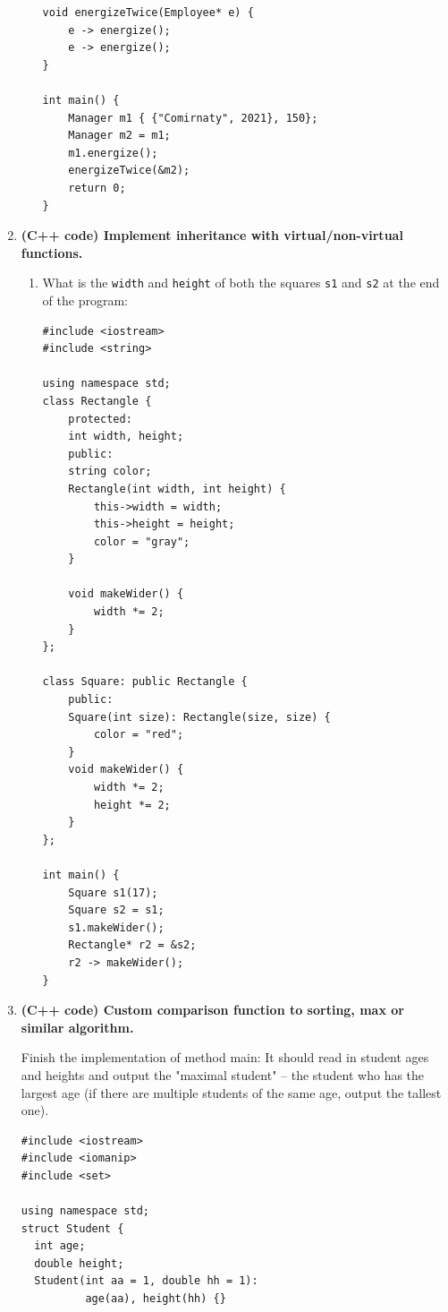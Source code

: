 \documentclass[a4paper,12pt]{article}
\begin{document}
\begin{enumerate}[label=2.\Alph*.]
\begin{enumerate}
\begin{verbatim}
void energizeTwice(Employee* e) {
    e -> energize();
    e -> energize();
}

int main() {
    Manager m1 { {"Comirnaty", 2021}, 150};
    Manager m2 = m1; 
    m1.energize();
    energizeTwice(&m2);
    return 0;
}
\end{verbatim}



\end{enumerate}
\item {\bf (C++ code) Implement inheritance with virtual/non-virtual functions.}

\begin{enumerate}
\item What is the {\tt width} and {\tt height} of both the squares
{\tt s1} and {\tt s2} at the end of the program: 

\begin{verbatim}
#include <iostream>
#include <string>

using namespace std;
class Rectangle {
    protected:
    int width, height; 
    public:
    string color;
    Rectangle(int width, int height) {
        this->width = width; 
        this->height = height;
        color = "gray";
    }    

    void makeWider() {
        width *= 2; 
    }
};

class Square: public Rectangle {
    public:
    Square(int size): Rectangle(size, size) {
        color = "red";        
    }
    void makeWider() {
        width *= 2;
        height *= 2;
    }
};

int main() {
    Square s1(17);
    Square s2 = s1;
    s1.makeWider();
    Rectangle* r2 = &s2;
    r2 -> makeWider();
}
\end{verbatim}
\end{enumerate}


\item {\bf (C++ code) Custom comparison function to sorting, max or similar algorithm.}

Finish the implementation of method main: 
It should read in student ages and heights and output the "maximal student" -- 
the student who has the largest age (if there are multiple students of the 
same age, output the tallest one). 

\begin{verbatim}
#include <iostream>
#include <iomanip> 
#include <set>

using namespace std;
struct Student {
  int age;
  double height;
  Student(int aa = 1, double hh = 1): 
          age(aa), height(hh) {}


\end{verbatim}
\end{enumerate}
\end{document}
